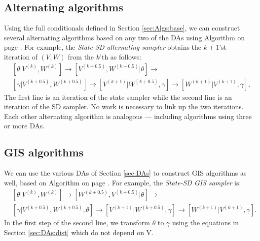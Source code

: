\documentclass[12pt]{article}
\begin{document}
\subsection{Alternating algorithms}\label{sec:Algs:alt}
Using the full conditionals defined in Section \ref{sec:Algs:base}, we can construct several alternating algorithms based on any two of the DAs using Algorithm  on page \pageref{alg:Alt}. For example, the {\it State-SD alternating sampler} obtains the $k+1$'st iteration of $(V,W)$ from the $k$'th as follows:\vspace{-.3cm}
\begin{align*}
&[\theta|V^{(k)},W^{(k)}] \to [V^{(k+0.5)},W^{(k+0.5)}|\theta] \to\\
&[\gamma|V^{(k+0.5)},W^{(k+0.5)}] \to [V^{(k+1)}|W^{(k+0.5)},\gamma] \to [W^{(k+1)}|V^{(k+1)},\gamma].
\end{align*}
The first line is an iteration of the state sampler while the second line is an iteration of the SD sampler. No work is necessary to link up the two iterations. Each other alternating algorithm is analogous --- including algorithms using three or more DAs. %

\subsection{GIS algorithms}\label{sec:Algs:GIS}
We can use the various DAs of Section \ref{sec:DAs} to construct GIS algorithms as well, based on Algorithm  on page \pageref{alg:eGIS}. For example, the {\it State-SD GIS sampler} is: \vspace{-.3cm}
\begin{align*}
&[\theta|V^{(k)},W^{(k)}] \to [W^{(k+0.5)},V^{(k+0.5)}|\theta] \to\\
&[\gamma|V^{(k+0.5)},W^{(k+0.5)},\theta] \to [V^{(k+1)}|W^{(k+0.5)},\gamma] \to [W^{(k+1)}|V^{(k+1)},\gamma].
\end{align*}
In the first step of the second line, we transform $\theta$ to $\gamma$ using the equations in Section \ref{sec:DAs:dist} which do not depend on V. 
\end{document}
